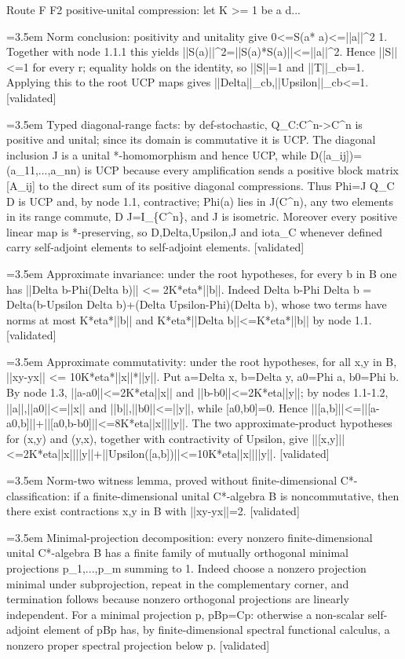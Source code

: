 \documentclass{article}
\newcommand{\step}[1]{\par\noindent\hangindent=3.5em\hangafter=1%
  \makebox[3.5em][l]{\textbf{#1.}}}
\newcommand{\steptag}[1]{\hfill{\small\textsf{[#1]}}}
\begin{document}
\begin{proofbox}{Route F F2 positive-unital compression: let K >= 1 be a d...}
\step{1.1.2} Norm conclusion: positivity and unitality give 0<=S(a* a)<=||a||\textasciicircum{}2 1. Together with node 1.1.1 this yields ||S(a)||\textasciicircum{}2=||S(a)*S(a)||<=||a||\textasciicircum{}2. Hence ||S||<=1 for every r; equality holds on the identity, so ||S||=1 and ||T||\_cb=1. Applying this to the root UCP maps gives ||Delta||\_cb,||Upsilon||\_cb<=1. \steptag{validated} \\[4pt]
\step{1.2} Typed diagonal-range facts: by def-stochastic, Q\_C:C\textasciicircum{}n->C\textasciicircum{}n is positive and unital; since its domain is commutative it is UCP. The diagonal inclusion J is a unital *-homomorphism and hence UCP, while D([a\_ij])=(a\_11,...,a\_nn) is UCP because every amplification sends a positive block matrix [A\_ij] to the direct sum of its positive diagonal compressions. Thus Phi=J Q\_C D is UCP and, by node 1.1, contractive; Phi(a) lies in J(C\textasciicircum{}n), any two elements in its range commute, D J=I\_\{C\textasciicircum{}n\}, and J is isometric. Moreover every positive linear map is *-preserving, so D,Delta,Upsilon,J and iota\_C whenever defined carry self-adjoint elements to self-adjoint elements. \steptag{validated} \\[4pt]
\step{1.3} Approximate invariance: under the root hypotheses, for every b in B one has ||Delta b-Phi(Delta b)|| <= 2K*eta*||b||. Indeed Delta b-Phi Delta b = Delta(b-Upsilon Delta b)+(Delta Upsilon-Phi)(Delta b), whose two terms have norms at most K*eta*||b|| and K*eta*||Delta b||<=K*eta*||b|| by node 1.1. \steptag{validated} \\[4pt]
\step{1.4} Approximate commutativity: under the root hypotheses, for all x,y in B, ||xy-yx|| <= 10K*eta*||x||*||y||. Put a=Delta x, b=Delta y, a0=Phi a, b0=Phi b. By node 1.3, ||a-a0||<=2K*eta||x|| and ||b-b0||<=2K*eta||y||; by nodes 1.1-1.2, ||a||,||a0||<=||x|| and ||b||,||b0||<=||y||, while [a0,b0]=0. Hence ||[a,b]||<=||[a-a0,b]||+||[a0,b-b0]||<=8K*eta||x||||y||. The two approximate-product hypotheses for (x,y) and (y,x), together with contractivity of Upsilon, give ||[x,y]||<=2K*eta||x||||y||+||Upsilon([a,b])||<=10K*eta||x||||y||. \steptag{validated} \\[4pt]
\step{1.5} Norm-two witness lemma, proved without finite-dimensional C*-classification: if a finite-dimensional unital C*-algebra B is noncommutative, then there exist contractions x,y in B with ||xy-yx||=2. \steptag{validated} \\[6pt]
\step{1.5.1} Minimal-projection decomposition: every nonzero finite-dimensional unital C*-algebra B has a finite family of mutually orthogonal minimal projections p\_1,...,p\_m summing to 1. Indeed choose a nonzero projection minimal under subprojection, repeat in the complementary corner, and termination follows because nonzero orthogonal projections are linearly independent. For a minimal projection p, pBp=Cp: otherwise a non-scalar self-adjoint element of pBp has, by finite-dimensional spectral functional calculus, a nonzero proper spectral projection below p. \steptag{validated} \\[4pt]

\end{proofbox}
\end{document}
